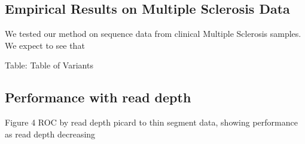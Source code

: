 \documentclass[11pt,reqno]{amsart}
\begin{document}
\subsection{Empirical Results on Multiple Sclerosis Data}
We tested our method on sequence data from clinical Multiple Sclerosis samples. We expect to see that 

Table: Table of Variants
\subsection{Performance with read depth}
Figure 4 ROC by read depth
picard to thin segment data, showing performance as read depth decreasing




\end{document}
